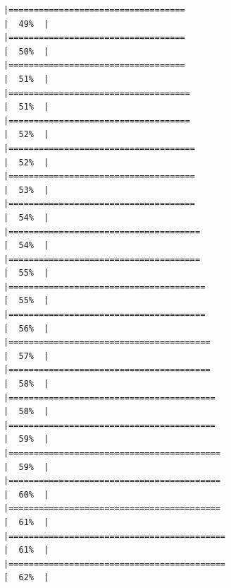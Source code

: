 \documentclass[
]{article}
\begin{document}
\begin{verbatim}
|===================================                                   |  49%  |                                                                              |===================================                                   |  50%  |                                                                              |===================================                                   |  51%  |                                                                              |====================================                                  |  51%  |                                                                              |====================================                                  |  52%  |                                                                              |=====================================                                 |  52%  |                                                                              |=====================================                                 |  53%  |                                                                              |=====================================                                 |  54%  |                                                                              |======================================                                |  54%  |                                                                              |======================================                                |  55%  |                                                                              |=======================================                               |  55%  |                                                                              |=======================================                               |  56%  |                                                                              |========================================                              |  57%  |                                                                              |========================================                              |  58%  |                                                                              |=========================================                             |  58%  |                                                                              |=========================================                             |  59%  |                                                                              |==========================================                            |  59%  |                                                                              |==========================================                            |  60%  |                                                                              |==========================================                            |  61%  |                                                                              |===========================================                           |  61%  |                                                                              |===========================================                           |  62%  |                                                                              
\end{verbatim}
\end{document}
